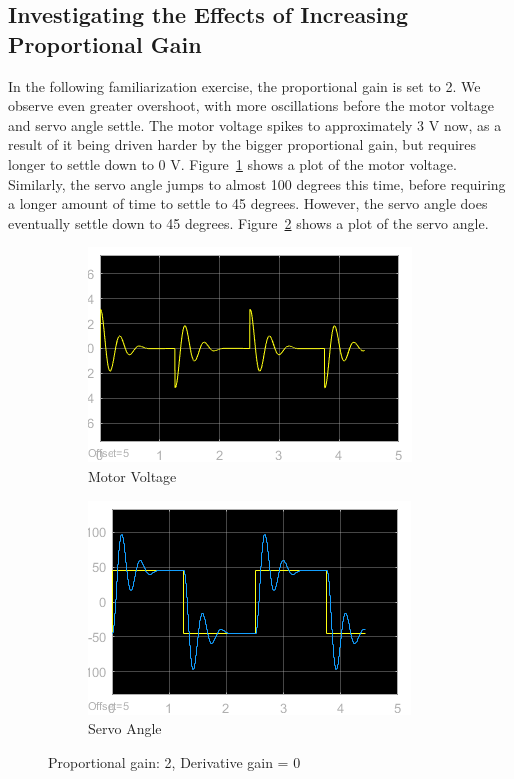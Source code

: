 \documentclass[12pt]{article}
\begin{document}
\subsection*{Investigating the Effects of Increasing Proportional Gain} %
In the following familiarization exercise, the proportional gain is set to 2. We observe even greater overshoot, with more oscillations before the motor voltage and servo angle settle. The motor voltage spikes to approximately 3 V now, as a result of it being driven harder by the bigger proportional gain, but requires longer to settle down to 0 V. Figure~\ref{fig:ix_volt} shows a plot of the motor voltage. Similarly, the servo angle jumps to almost 100 degrees this time, before requiring a longer amount of time to settle to 45 degrees. However, the servo angle does eventually settle down to 45 degrees. Figure~\ref{fig:ix_angle} shows a plot of the servo angle.
\begin{figure}[h!]
    \centering
    \begin{subfigure}[b]{0.46\textwidth}
        \includegraphics[width=\textwidth]{ix_voltage}
        \caption{\label{fig:ix_volt}Motor Voltage}
    \end{subfigure}
    \begin{subfigure}[b]{0.46\textwidth}
        \includegraphics[width=\textwidth]{ix_angle}
        \caption{\label{fig:ix_angle}Servo Angle}
    \end{subfigure}
    \caption{\label{fig:ix} Proportional gain: 2, Derivative gain = 0}
\end{figure}
\end{document}
